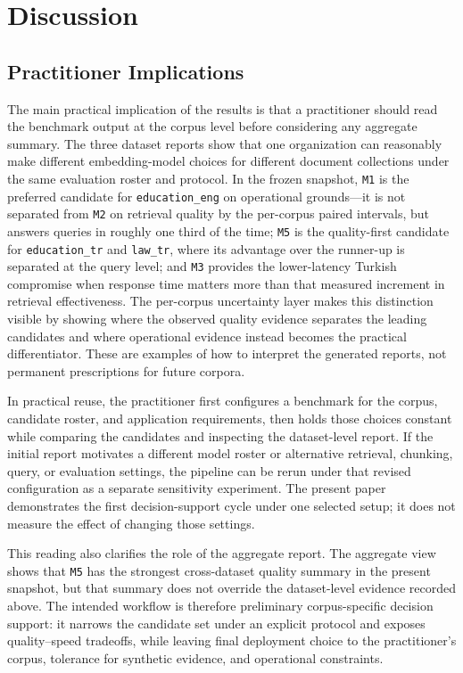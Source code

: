 \section{Discussion}\label{discussion}

\subsection{Practitioner Implications}\label{discussion-practitioner-implications}

The main practical implication of the results is that a practitioner should read the benchmark output at the corpus level before considering any aggregate summary. The three dataset reports show that one organization can reasonably make different embedding-model choices for different document collections under the same evaluation roster and protocol. In the frozen snapshot, \texttt{M1} is the preferred candidate for \texttt{education\_eng} on operational grounds---it is not separated from \texttt{M2} on retrieval quality by the per-corpus paired intervals, but answers queries in roughly one third of the time; \texttt{M5} is the quality-first candidate for \texttt{education\_tr} and \texttt{law\_tr}, where its advantage over the runner-up is separated at the query level; and \texttt{M3} provides the lower-latency Turkish compromise when response time matters more than that measured increment in retrieval effectiveness. The per-corpus uncertainty layer makes this distinction visible by showing where the observed quality evidence separates the leading candidates and where operational evidence instead becomes the practical differentiator. These are examples of how to interpret the generated reports, not permanent prescriptions for future corpora.

In practical reuse, the practitioner first configures a benchmark for the corpus, candidate roster, and application requirements, then holds those choices constant while comparing the candidates and inspecting the dataset-level report. If the initial report motivates a different model roster or alternative retrieval, chunking, query, or evaluation settings, the pipeline can be rerun under that revised configuration as a separate sensitivity experiment. The present paper demonstrates the first decision-support cycle under one selected setup; it does not measure the effect of changing those settings.

This reading also clarifies the role of the aggregate report. The aggregate view shows that \texttt{M5} has the strongest cross-dataset quality summary in the present snapshot, but that summary does not override the dataset-level evidence recorded above. The intended workflow is therefore preliminary corpus-specific decision support: it narrows the candidate set under an explicit protocol and exposes quality--speed tradeoffs, while leaving final deployment choice to the practitioner's corpus, tolerance for synthetic evidence, and operational constraints.

